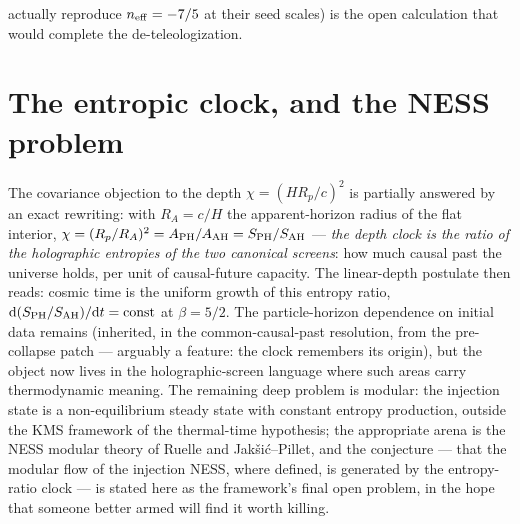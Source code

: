 \documentclass[11pt]{article}
\begin{document}
actually reproduce $n_{\rm eff} = -7/5$ at their seed scales) is the open calculation that would complete the de-teleologization.

\section{The entropic clock, and the NESS problem}
The covariance objection to the depth $\chi = (HR_p/c)^2$ is partially answered by an exact rewriting: with $R_A = c/H$ the apparent-horizon radius of the flat interior, $\chi = (R_p/R_A)^2 = A_{\rm PH}/A_{\rm AH} = S_{\rm PH}/S_{\rm AH}$ --- \emph{the depth clock is the ratio of the holographic entropies of the two canonical screens}: how much causal past the universe holds, per unit of causal-future capacity. The linear-depth postulate then reads: cosmic time is the uniform growth of this entropy ratio, $\mathrm{d}(S_{\rm PH}/S_{\rm AH})/\mathrm{d}t = \mathrm{const}$ at $\beta = 5/2$. The particle-horizon dependence on initial data remains (inherited, in the common-causal-past resolution, from the pre-collapse patch --- arguably a feature: the clock remembers its origin), but the object now lives in the holographic-screen language where such areas carry thermodynamic meaning. The remaining deep problem is modular: the injection state is a non-equilibrium steady state with constant entropy production, outside the KMS framework of the thermal-time hypothesis; the appropriate arena is the NESS modular theory of Ruelle and Jak\v{s}i\'c--Pillet, and the conjecture --- that the modular flow of the injection NESS, where defined, is generated by the entropy-ratio clock --- is stated here as the framework's final open problem, in the hope that someone better armed will find it worth killing.
\end{document}
